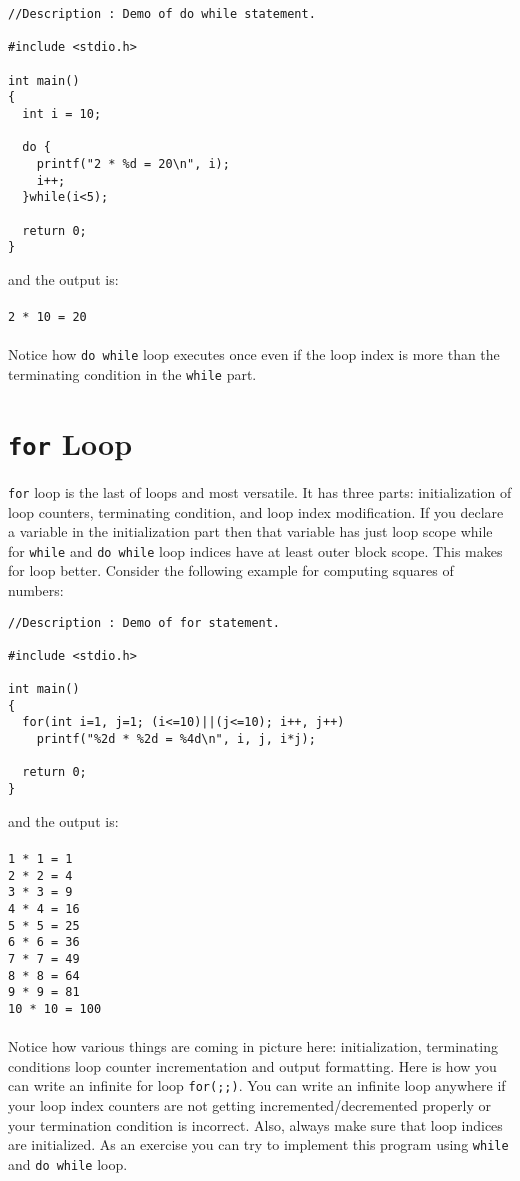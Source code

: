 \begin{verbatim}
//Description : Demo of do while statement.

#include <stdio.h>

int main()
{
  int i = 10;

  do {
    printf("2 * %d = 20\n", i);
    i++;
  }while(i<5);

  return 0;
}
\end{verbatim}
and the output is:
\\\\\texttt{2 * 10 = 20\\\\}
Notice how \texttt{do while} loop executes once even if the loop index is more
than the terminating condition in the \texttt{while} part.
\section{\texttt{for} Loop}
\texttt{for} loop is the last of loops and most versatile. It has three parts:
initialization of loop counters, terminating condition, and loop index
modification. If you declare a variable in the initialization part then that
variable has just loop scope while for \texttt{while} and \texttt{do while}
loop indices have at least outer block scope. This makes for loop
better. Consider the following example for computing squares of numbers:

\begin{verbatim}
//Description : Demo of for statement.

#include <stdio.h>

int main()
{
  for(int i=1, j=1; (i<=10)||(j<=10); i++, j++)
    printf("%2d * %2d = %4d\n", i, j, i*j);

  return 0;
}
\end{verbatim}
and the output is:
\\\\\texttt{1 *  1 =    1\\
2 *  2 =    4\\
3 *  3 =    9\\
4 *  4 =   16\\
5 *  5 =   25\\
6 *  6 =   36\\
7 *  7 =   49\\
8 *  8 =   64\\
9 *  9 =   81\\
10 * 10 =  100\\\\}
Notice how various things are coming in picture here: initialization,
terminating conditions loop counter incrementation and output formatting. Here
is how you can write an infinite for loop \texttt{for(;;)}. You can write an
infinite loop anywhere if your loop index counters are not getting
incremented/decremented properly or your termination condition is
incorrect. Also, always make sure that loop indices are initialized. As an
exercise you can try to implement this program using \texttt{while} and
\texttt{do while} loop.

